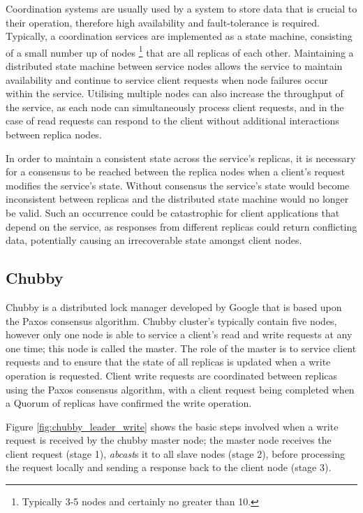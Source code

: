 Coordination systems are usually used by a system to store data that is crucial to their operation, therefore high availability and fault-tolerance is required. Typically, a coordination services are implemented as a state machine, consisting of a small number up of nodes \footnote{Typically 3-5 nodes and certainly no greater than 10.} that are all replicas of each other.  Maintaining a distributed state machine between service nodes allows the service to maintain availability and continue to service client requests when node failures occur within the service. Utilising multiple nodes can also increase the throughput of the service, as each node can simultaneously process client requests, and in the case of read requests can respond to the client without additional interactions between replica nodes.  

In order to maintain a consistent state across the service's replicas, it is necessary for a consensus to be reached between the replica nodes when a client's request modifies the service's state.  Without consensus the service's state would become inconsistent between replicas and the distributed state machine would no longer be valid.  Such an occurrence could be catastrophic for client applications that depend on the service, as responses from different replicas could return conflicting data, potentially causing an irrecoverable state amongst client nodes.  

	\subsection{Chubby}
	Chubby\citep{Burrows:2006:CLS:1298455.1298487} is a distributed lock manager developed by Google that is based upon the Paxos\citep{Lamport:1998:PP:279227.279229}\citep{Lamport:2001:PaxosMadeSimple} consensus algorithm. Chubby cluster's typically contain five nodes, however only one node is able to service a client's read and write requests at any one time; this node is called the master. The role of the master is to service client requests and to ensure that the state of all replicas is updated when a write operation is requested.  Client write requests are coordinated between replicas using the Paxos consensus algorithm, with a client request being completed when a Quorum of replicas have confirmed the write operation.  
	
Figure \ref{fig:chubby_leader_write} shows the basic steps involved when a write request is received by the chubby master node; the master node receives the client request (stage 1), \emph{abcast}s it to all slave nodes (stage 2), before processing the request locally and sending a response back to the client node (stage 3).  

